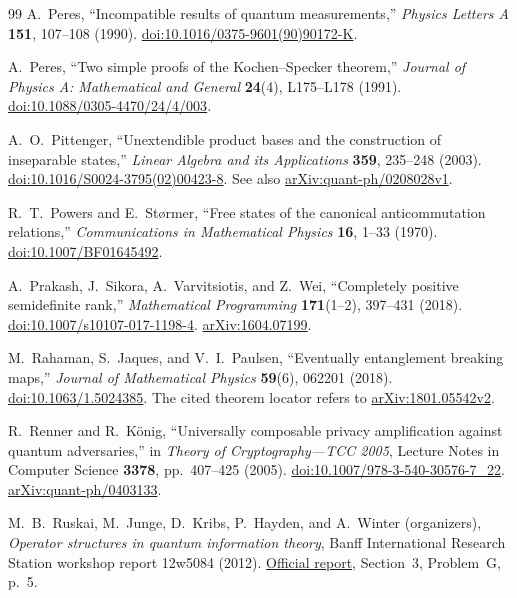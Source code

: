 \begin{thebibliography}{99}
A.~Peres,
``Incompatible results of quantum measurements,''
\emph{Physics Letters A} \textbf{151}, 107--108 (1990).
\href{https://doi.org/10.1016/0375-9601(90)90172-K}{doi:10.1016/0375-9601(90)90172-K}.

A.~Peres,
``Two simple proofs of the Kochen--Specker theorem,''
\emph{Journal of Physics A: Mathematical and General}
\textbf{24}(4), L175--L178 (1991).
\href{https://doi.org/10.1088/0305-4470/24/4/003}{doi:10.1088/0305-4470/24/4/003}.

A.~O.~Pittenger,
``Unextendible product bases and the construction of
inseparable states,'' \emph{Linear Algebra and its Applications} \textbf{359}, 235--248 (2003).
\href{https://doi.org/10.1016/S0024-3795(02)00423-8}{doi:10.1016/S0024-3795(02)00423-8}.
See also \href{https://arxiv.org/abs/quant-ph/0208028v1}{arXiv:quant-ph/0208028v1}.

R.~T.~Powers and E.~St{\o}rmer,
``Free states of the canonical anticommutation relations,''
\emph{Communications in Mathematical Physics} \textbf{16}, 1--33 (1970).
\href{https://doi.org/10.1007/BF01645492}{doi:10.1007/BF01645492}.

A.~Prakash, J.~Sikora, A.~Varvitsiotis, and Z.~Wei,
``Completely positive semidefinite rank,''
\emph{Mathematical Programming} \textbf{171}(1--2), 397--431 (2018).
\href{https://doi.org/10.1007/s10107-017-1198-4}{doi:10.1007/s10107-017-1198-4}.
\href{https://arxiv.org/abs/1604.07199}{arXiv:1604.07199}.

M.~Rahaman, S.~Jaques, and V.~I.~Paulsen,
``Eventually entanglement breaking maps,''
\emph{Journal of Mathematical Physics} \textbf{59}(6), 062201 (2018).
\href{https://doi.org/10.1063/1.5024385}{doi:10.1063/1.5024385}.
The cited theorem locator refers to
\href{https://arxiv.org/abs/1801.05542v2}{arXiv:1801.05542v2}.

R.~Renner and R.~K\"onig,
``Universally composable privacy amplification against quantum adversaries,''
in \emph{Theory of Cryptography---TCC 2005},
Lecture Notes in Computer Science \textbf{3378}, pp.~407--425 (2005).
\href{https://doi.org/10.1007/978-3-540-30576-7_22}{doi:10.1007/978-3-540-30576-7\_22}.
\href{https://arxiv.org/abs/quant-ph/0403133}{arXiv:quant-ph/0403133}.

M.~B.~Ruskai, M.~Junge, D.~Kribs, P.~Hayden, and A.~Winter (organizers),
\emph{Operator structures in quantum information theory}, Banff International
Research Station workshop report 12w5084 (2012).
\href{https://www.birs.ca/workshops/2012/12w5084/report12w5084.pdf}{Official report},
Section~3, Problem~G, p.~5.


\end{thebibliography}
